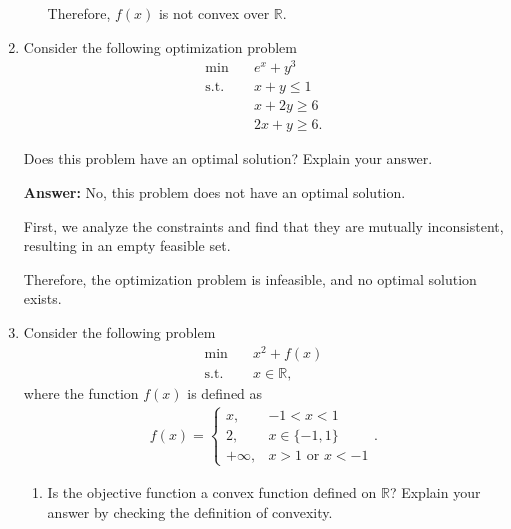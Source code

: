 \documentclass{article}
\begin{document}
\begin{enumerate}
\begin{enumerate}
    Therefore, $f(x)$ is not convex over $\mathbb{R}$.
\end{enumerate}

\item Consider the following optimization problem
\begin{align*}
    \min \quad & e^x + y^3\\
    \text{s.t.} \quad & x + y \le 1 \\
                      & x + 2y \ge 6 \\
                      & 2x + y  \ge 6.
\end{align*}

Does this problem have an optimal solution? Explain your answer.

\textbf{Answer:} No, this problem does not have an optimal solution.

First, we analyze the constraints and find that they are mutually inconsistent, resulting in an empty feasible set.

Therefore, the optimization problem is infeasible, and no optimal solution exists.

\item Consider the following problem
\begin{align*}
    \min \quad & x^2 + f(x) \\
    \text{s.t.} \quad & x \in \mathbb{R},
\end{align*}
where the function $f(x)$ is defined as
\begin{align*}
    f(x) = \begin{cases}
                x, & -1 < x < 1\\
                2, & x \in \{-1, 1\}\\
                +\infty, & x>1 \text{ or } x<-1
            \end{cases}.
\end{align*}    
\begin{enumerate}
    \item Is the objective function a convex function defined on $\mathbb{R}$? Explain your answer by checking the definition of convexity.
    

\end{enumerate}
\end{enumerate}
\end{document}
